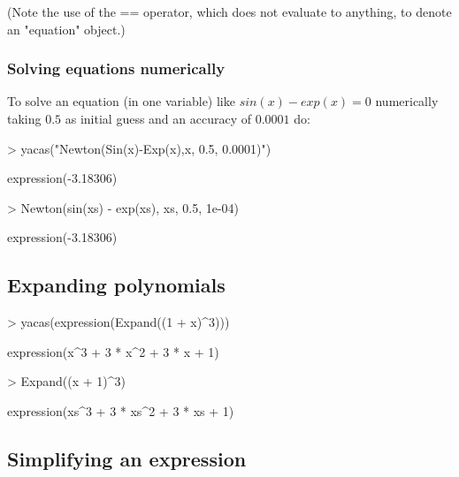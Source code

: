 \documentclass[]{article}
\begin{document}
(Note the use of the == operator, which does not evaluate to anything,
to denote an "equation" object.) 

\subsubsection{Solving equations numerically}
To solve an equation (in one variable) like $sin(x)-exp(x)=0$ numerically taking $0.5$
as initial guess and an accuracy of $0.0001$ do:
\begin{Schunk}
\begin{Sinput}
> yacas("Newton(Sin(x)-Exp(x),x, 0.5, 0.0001)")
\end{Sinput}
\begin{Soutput}
expression(-3.18306)
\end{Soutput}
\end{Schunk}

\begin{Schunk}
\begin{Sinput}
> Newton(sin(xs) - exp(xs), xs, 0.5, 1e-04)
\end{Sinput}
\begin{Soutput}
expression(-3.18306)
\end{Soutput}
\end{Schunk}

\subsection{Expanding polynomials} 
\begin{Schunk}
\begin{Sinput}
> yacas(expression(Expand((1 + x)^3)))
\end{Sinput}
\begin{Soutput}
expression(x^3 + 3 * x^2 + 3 * x + 1)
\end{Soutput}
\end{Schunk}

\begin{Schunk}
\begin{Sinput}
> Expand((x + 1)^3)
\end{Sinput}
\begin{Soutput}
expression(xs^3 + 3 * xs^2 + 3 * xs + 1)
\end{Soutput}
\end{Schunk}



\subsection{Simplifying an expression}
\end{document}
